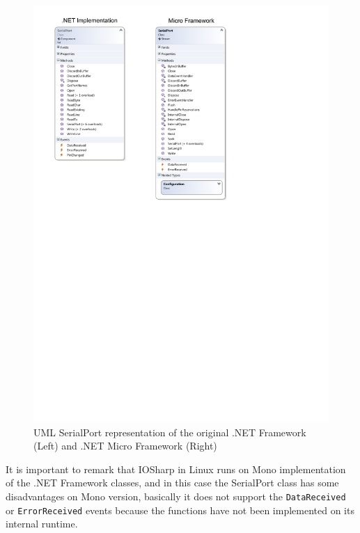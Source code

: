 \begin{figure}[H]\begin{center}
 \centering
  \captionsetup{justification=centering}
  \includegraphics[scale=1]{pictures/iosharp/serialport-uml}
  \caption{UML SerialPort representation of the original .NET Framework (Left) and .NET Micro Framework (Right)\label{fig:serialport-uml}}
\end{center}\end{figure}

It is important to remark that IOSharp in Linux runs on Mono implementation of the .NET Framework classes, and in this case the SerialPort class has some disadvantages on Mono version, basically it does not support the \verb!DataReceived! or \verb!ErrorReceived! events because the functions have not been implemented on its internal runtime.

